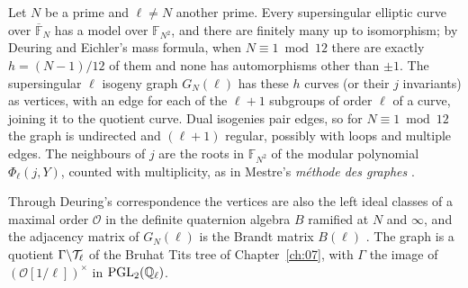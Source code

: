 Let $N$ be a prime and $\ell\ne N$ another prime. Every supersingular elliptic curve over $\overline{\mathbb F}_N$ has a model over $\mathbb F_{N^2}$, and there are finitely many up to isomorphism; by Deuring \cite{deuring1941} and Eichler's mass formula, when $N\equiv1\bmod12$ there are exactly $h=(N-1)/12$ of them and none has automorphisms other than $\pm1$. The supersingular $\ell$ isogeny graph $G_N(\ell)$ has these $h$ curves (or their $j$ invariants) as vertices, with an edge for each of the $\ell+1$ subgroups of order $\ell$ of a curve, joining it to the quotient curve. Dual isogenies pair edges, so for $N\equiv1\bmod12$ the graph is undirected and $(\ell+1)$ regular, possibly with loops and multiple edges. The neighbours of $j$ are the roots in $\mathbb F_{N^2}$ of the modular polynomial $\Phi_\ell(j,Y)$, counted with multiplicity, as in Mestre's \emph{m\'ethode des graphes} \cite{mestre1986}.

Through Deuring's correspondence the vertices are also the left ideal classes of a maximal order $\mathcal O$ in the definite quaternion algebra $B$ ramified at $N$ and $\infty$, and the adjacency matrix of $G_N(\ell)$ is the Brandt matrix $B(\ell)$ \cite{eichler1954,gross1987}. The graph is a quotient $\Gamma\backslash\mathcal{T}_\ell$ of the Bruhat Tits tree of Chapter~\ref{ch:07}, with $\Gamma$ the image of $(\mathcal O[1/\ell])^\times$ in $\mathrm{PGL}_2(\mathbb{Q}_\ell)$.


